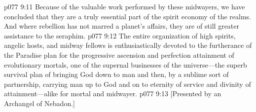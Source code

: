\vs p077 9:11 Because of the valuable work performed by these midwayers, we have concluded that they are a truly essential part of the spirit economy of the realms. And where rebellion has not marred a planet’s affairs, they are of still greater assistance to the seraphim.
\pc \vs p077 9:12 The entire organization of high spirits, angelic hosts, and midway fellows is enthusiastically devoted to the furtherance of the Paradise plan for the progressive ascension and perfection attainment of evolutionary mortals, one of the supernal businesses of the universe---the superb survival plan of bringing God down to man and then, by a sublime sort of partnership, carrying man up to God and on to eternity of service and divinity of attainment---alike for mortal and midwayer.
\vsetoff
\vs p077 9:13 [Presented by an Archangel of Nebadon.]
